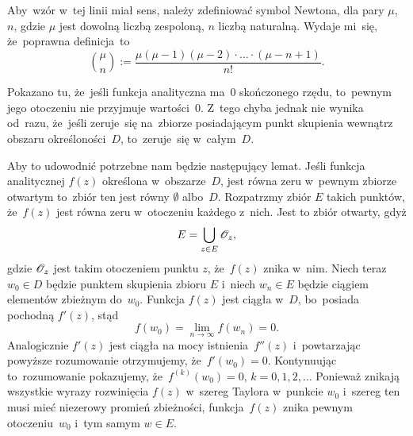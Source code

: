 \documentclass[a4paper,11pt]{article}
\begin{document}
\vspace{\spaceFour}





\noindent
{} Aby~wzór w~tej linii miał sens, należy zdefiniować symbol
Newtona, dla pary $\mu$, $n$, gdzie $\mu$ jest dowolną liczbą zespoloną, $n$
liczbą naturalną. Wydaje mi~się, że~poprawna definicja~to
\begin{equation}
  \label{eq:Leja-Funkcje-zespolone-43}
  \binom{ \mu }{ n } :=
  \frac{ \mu ( \mu - 1 ) ( \mu - 2 ) \cdot \ldots \cdot ( \mu - n + 1 ) }{ n! }.
\end{equation}

\vspace{\spaceFour}





\noindent
{} Pokazano tu, że~jeśli funkcja analityczna ma~0 skończonego rzędu,
to~pewnym jego otoczeniu nie przyjmuje wartości~0. Z~tego chyba jednak nie
wynika od~razu, że~jeśli zeruje~się na~zbiorze posiadającym punkt skupienia
wewnątrz obszaru określoności~$D$, to~zeruje~się w~całym~$D$.

Aby to udowodnić potrzebne nam będzie następujący lemat. Jeśli funkcja
analitycznej $f( z )$ określona w~obszarze~$D$, jest równa zeru
w~pewnym zbiorze otwartym to~zbiór ten jest równy $\emptyset$
albo~$D$. Rozpatrzmy zbiór $E$ takich punktów, że~$f( z )$ jest równa
zeru w~otoczeniu każdego z~nich. Jest to zbiór otwarty, gdyż
\begin{equation}
  \label{eq:Leja-Funkcje-zespolone-44}
  E = \bigcup_{ z \in E } \mathcal{O}_{ z },
\end{equation}
gdzie $\mathcal{O}_{ z }$ jest takim otoczeniem punktu $z$, że~$f( z )$
znika w~nim. Niech teraz $w_{ 0 } \in D$ będzie punktem skupienia
zbioru $E$ i~niech $w_{ n } \in E$ będzie ciągiem elementów zbieżnym
do~$w_{ 0 }$. Funkcja $f( z )$ jest ciągła w~$D$, bo~posiada pochodną
$f'( z )$, stąd
\begin{equation}
  \label{eq:Leja-Funkcje-zespolone-45}
  f( w_{ 0 } ) = \lim\limits_{ n \to \infty } f( w_{ n } ) = 0.
\end{equation}
Analogicznie $f'( z )$ jest ciągła na mocy istnienia~$f''( z )$
i~powtarzając powyższe rozumowanie otrzymujemy,
że~$f'( w_{ 0 } ) = 0$. Kontynuując to~rozumowanie pokazujemy,
że~$f^{ ( k ) }( w_{ 0 } ) = 0$, $k = 0, 1, 2, \ldots$ Ponieważ znikają
wszystkie wyrazy rozwinięcia $f( z )$ w~szereg Taylora w~punkcie
$w_{ 0 }$ i~szereg ten musi mieć niezerowy promień zbieżności,
funkcja~$f( z )$ znika pewnym otoczeniu~$w_{ 0 }$ i~tym samym $w \in E$.
\end{document}
